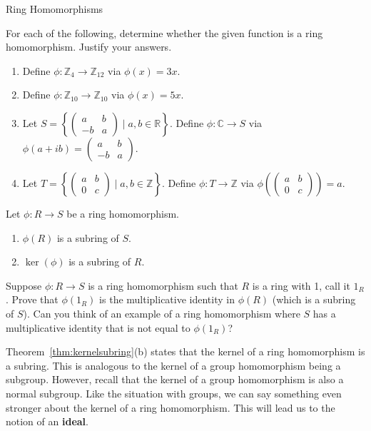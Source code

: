 \begin{section}{Ring Homomorphisms}
\begin{exercise}
For each of the following, determine whether the given function is a ring homomorphism.  Justify your answers.
\begin{enumerate}[label=\rm{(\alph*)}]
\item Define $\phi:\mathbb{Z}_4\to \mathbb{Z}_{12}$ via $\phi(x)=3x$.
\item Define $\phi:\mathbb{Z}_{10}\to \mathbb{Z}_{10}$ via $\phi(x)=5x$.
\item Let $\displaystyle S=\left\{\begin{pmatrix}a & b\\ -b & a\end{pmatrix}\mid a, b\in \mathbb{R}\right\}$.  Define $\phi:\mathbb{C}\to S$ via $\displaystyle \phi(a+ib)=\begin{pmatrix}a & b\\ -b & a\end{pmatrix}$.
\item Let $\displaystyle T=\left\{\begin{pmatrix}a & b\\ 0 & c\end{pmatrix}\mid a, b\in \mathbb{Z}\right\}$. Define $\phi:T\to \mathbb{Z}$ via $\displaystyle \phi\left(\begin{pmatrix}a & b\\ 0 & c\end{pmatrix}\right)=a$.
\end{enumerate}
\end{exercise}

\begin{theorem}\label{thm:kernelsubring}
Let $\phi:R\to S$ be a ring homomorphism.
\begin{enumerate}[label=\rm{(\alph*)}]
\item $\phi(R)$ is a subring of $S$.
\item $\ker(\phi)$ is a subring of $R$.
\end{enumerate}
\end{theorem}

\begin{problem}
Suppose $\phi:R\to S$ is a ring homomorphism such that $R$ is a ring with 1, call it $1_R$.  Prove that $\phi(1_R)$ is the multiplicative identity in $\phi(R)$ (which is a subring of $S$).  Can you think of an example of a ring homomorphism where $S$ has a multiplicative identity that is not equal to $\phi(1_R)$?
\end{problem}

Theorem~\ref{thm:kernelsubring}(b) states that the kernel of a ring homomorphism is a subring. This is analogous to the kernel of a group homomorphism being a subgroup. However, recall that the kernel of a group homomorphism is also a normal subgroup. Like the situation with groups, we can say something even stronger about the kernel of a ring homomorphism. This will lead us to the notion of an \textbf{ideal}.


\end{section}

